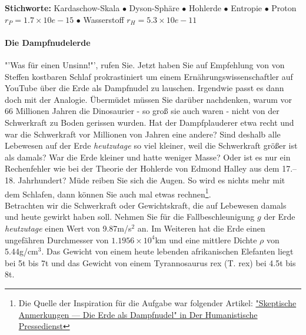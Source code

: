 \documentclass[a4paper, 9pt]{scrartcl}\usepackage[]{graphicx}\usepackage[]{xcolor}
\begin{document}
{\tiny\textbf{Stichworte:} Kardaschow-Skala $\bullet$ Dyson-Sphäre $\bullet$ Hohlerde $\bullet$ Entropie $\bullet$ Proton $r_P = 1.7 \times 10e-15$ $\bullet$ Wasserstoff $r_H = 5.3\times 10e-11$}

\paragraph{Die Dampfnudelerde}



"'Was für einen Unsinn!"', rufen Sie. Jetzt haben Sie auf Empfehlung von von Steffen kostbaren Schlaf prokrastiniert um einem Ernährungswissenschaftler auf YouTube über die Erde als Dampfnudel zu lauschen. Irgendwie passt es dann doch mit der Analogie. Übermüdet müssen Sie darüber nachdenken, warum vor 66 Millionen Jahren die Dinosaurier - so groß sie auch waren - nicht von der Schwerkraft zu Boden gerissen wurden. Hat der Dampfplauderer etwa recht und war die Schwerkraft vor Millionen von Jahren eine andere?  Sind deshalb alle Lebewesen auf der Erde \textit{heutzutage} so viel kleiner, weil die Schwerkraft größer ist als damals? War die Erde kleiner und hatte weniger Masse? Oder ist es nur ein Rechenfehler wie bei der Theorie der Hohlerde von Edmond Halley aus dem 17.–18. Jahrhundert? Müde reiben Sie sich die Augen. So wird es nichts mehr mit dem Schlafen, dann können Sie auch mal etwas rechnen\footnote{Die Quelle der Inspiration
  für die Aufgabe war folgender Artikel:
  \href{https://hpd.de/artikel/erde-dampfnudel-22236}{"Skeptische Anmerkungen --- Die Erde als Dampfnudel" in Der Humanistische Pressedienst}}.  \\

Betrachten wir die Schwerkraft oder Gewichtskraft, die auf Lebewesen damals und heute gewirkt haben soll. Nehmen Sie für die Fallbeschleunigung $g$ der Erde \textit{heutzutage} einen Wert von 9.87m/s$^2$ an. Im Weiteren hat die Erde einen ungefähren Durchmesser von \ensuremath{1.1956\times 10^{4}}km und eine mittlere Dichte $\rho$ von 5.44g/cm$^3$. Das Gewicht von einem heute lebenden afrikanischen Elefanten liegt bei 5t bis 7t und das Gewicht von einem Tyrannosaurus rex (T. rex) bei 4.5t bis 8t.
\end{document}
